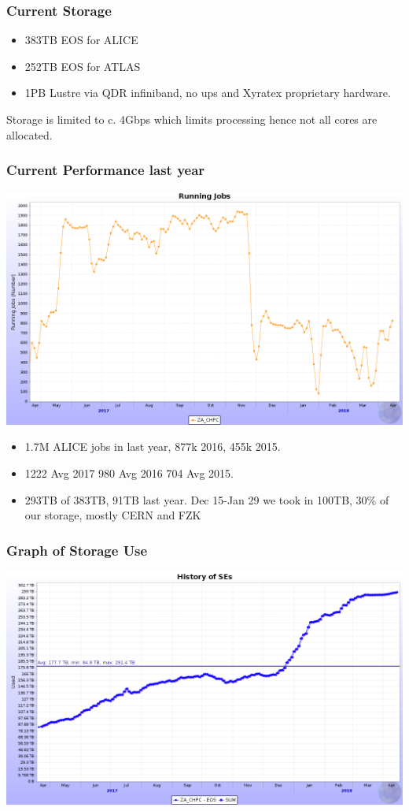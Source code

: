 \documentclass{beamer}
\begin{document}
\begin{frame}
  \frametitle{Current Storage}
  \begin{itemize}
    \item 383TB EOS for ALICE
    \item 252TB EOS for ATLAS
    \item 1PB Lustre via QDR infiniband, no ups and Xyratex proprietary hardware.
  \end{itemize}
    Storage is limited to c. 4Gbps which limits processing hence not all cores are allocated.
\end{frame}

\begin{frame}
  \frametitle{Current Performance last year}
    \includegraphics[scale=0.25]{ALICERunning1Year.png}
\begin{itemize}%
  \item 1.7M ALICE jobs in last year, 877k 2016, 455k 2015.
  \item 1222 Avg 2017  980 Avg 2016 704 Avg 2015.
  \item 293TB of 383TB, 91TB last year. Dec 15-Jan 29 we took in 100TB, 30\% of our storage, mostly CERN and FZK
\end{itemize}
\end{frame}

\begin{frame}
    \frametitle{Graph of Storage Use}
    \includegraphics[scale=0.25]{ALICEStorageUtilisation.png}
\end{frame}
\end{document}
